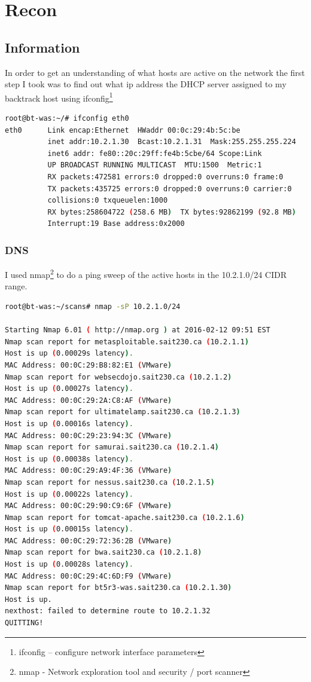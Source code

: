 \documentclass{article}
\begin{document}
\newpage
\section{Recon}
\subsection{Information}

In order to get an understanding of what hosts are active on the network the first step 
I took was to find out what ip address the DHCP server assigned to my backtrack host using 
ifconfig\footnote{\label{ifconfig}ifconfig -- configure network interface parameters} 

\begin{lstlisting}[language=Bash, firstline=1, lastline=3]
root@bt-was:~/# ifconfig eth0
eth0      Link encap:Ethernet  HWaddr 00:0c:29:4b:5c:be  
          inet addr:10.2.1.30  Bcast:10.2.1.31  Mask:255.255.255.224
          inet6 addr: fe80::20c:29ff:fe4b:5cbe/64 Scope:Link
          UP BROADCAST RUNNING MULTICAST  MTU:1500  Metric:1
          RX packets:472581 errors:0 dropped:0 overruns:0 frame:0
          TX packets:435725 errors:0 dropped:0 overruns:0 carrier:0
          collisions:0 txqueuelen:1000 
          RX bytes:258604722 (258.6 MB)  TX bytes:92862199 (92.8 MB)
          Interrupt:19 Base address:0x2000 
\end{lstlisting}

\subsubsection{DNS}

I used nmap\footnote{\label{nmap}nmap - Network exploration tool and security / port scanner} 
to do a ping sweep of the active hosts in the 
10.2.1.0/24 CIDR range.

\begin{lstlisting}[language=Bash, firstline=1, lastline=1]
root@bt-was:~/scans# nmap -sP 10.2.1.0/24

Starting Nmap 6.01 ( http://nmap.org ) at 2016-02-12 09:51 EST
Nmap scan report for metasploitable.sait230.ca (10.2.1.1)
Host is up (0.00029s latency).
MAC Address: 00:0C:29:B8:82:E1 (VMware)
Nmap scan report for websecdojo.sait230.ca (10.2.1.2)
Host is up (0.00027s latency).
MAC Address: 00:0C:29:2A:C8:AF (VMware)
Nmap scan report for ultimatelamp.sait230.ca (10.2.1.3)
Host is up (0.00016s latency).
MAC Address: 00:0C:29:23:94:3C (VMware)
Nmap scan report for samurai.sait230.ca (10.2.1.4)
Host is up (0.00038s latency).
MAC Address: 00:0C:29:A9:4F:36 (VMware)
Nmap scan report for nessus.sait230.ca (10.2.1.5)
Host is up (0.00022s latency).
MAC Address: 00:0C:29:90:C9:6F (VMware)
Nmap scan report for tomcat-apache.sait230.ca (10.2.1.6)
Host is up (0.00015s latency).
MAC Address: 00:0C:29:72:36:2B (VMware)
Nmap scan report for bwa.sait230.ca (10.2.1.8)
Host is up (0.00028s latency).
MAC Address: 00:0C:29:4C:6D:F9 (VMware)
Nmap scan report for bt5r3-was.sait230.ca (10.2.1.30)
Host is up.
nexthost: failed to determine route to 10.2.1.32
QUITTING!
\end{lstlisting}
\end{document}
